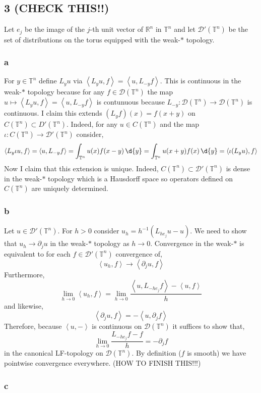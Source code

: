 \documentclass[12pt]{article}
\newcommand{\inner}[2]{\left< #1, #2 \right>}
\newcommand{\R}{\mathbb{R}}
\renewcommand{\T}{\mathbb{T}}
\renewcommand{\D}{\mathcal{D}}
\begin{document}
\subsection{3 (CHECK THIS!!)}

Let $e_j$ be the image of the $j$-th unit vector of $\R^n$ in $\T^n$ and let $\D'(\T^n)$ be the set of distributions on the torus equipped with the weak-$*$ topology.

\subsubsection{a}

For $y \in \T^n$ define $L_y u$ via $\inner{L_y u}{f} = \inner{u}{L_{-y} f}$. This is continuous in the weak-$*$ topology because for any $f \in \D(\T^n)$ the map $u \mapsto \inner{L_y u}{f} = \inner{u}{L_{-y} f}$ is contunuous because $L_{-y} : \D(\T^n) \to \D(\T^n)$ is continuous. I claim this extends $(L_y f)(x) = f(x + y)$ on $C(\T^n) \subset D'(\T^n)$. Indeed, for any $u \in C(\T^n)$ and the map $\iota : C(\T^n) \to \D'(\T^n)$ consider,
\[ \inner{L_y \iota u}{f} = \inner{u}{L_{-y} f} = \int_{\T^n} u(x) f(x - y) \, \d{y} = \int_{\T^n} u(x + y) f(x) \, \d{y} = \inner{\iota (L_y u) }{f} \]
Now I claim that this extension is unique. Indeed, $C(\T^n) \subset \D'(\T^n)$ is dense in the weak-$*$ topology which is a Hausdorff space so operators defined on $C(\T^n)$ are uniquely determined.

\subsubsection{b}

Let $u \in \D'(\T^n)$. For $h > 0$ consider $u_h = h^{-1}(L_{h e_j} u - u)$. We need to show that $u_h \to \partial_j u$ in the weak-$*$ topology as $h \to 0$. Convergence in the weak-$*$ is equivalent to for each $f \in \D'(\T^n)$ convergence of,
\[ \inner{u_h}{f} \to \inner{\partial_j u}{f} \]
Furthermore,
\[ \lim_{h \to 0} \inner{u_h}{f} = \lim_{h \to 0} \frac{\inner{u}{L_{-h e_j} f} - \inner{u}{f}}{h} \]
and likewise,
\[ \inner{\partial_j u}{f} = - \inner{u}{\partial_j f} \]
Therefore, because $\inner{u}{-}$ is continuous on $\D(\T^n)$ it suffices to show that,
\[ \lim_{h \to 0} \frac{L_{-he_j} f - f}{h} = - \partial_j f \]
in the canonical LF-topology on $\D(\T^n)$. By definition ($f$ is smooth) we have pointwise convergence everywhere. (HOW TO FINISH THIS!!!)

\subsubsection{c}
\end{document}
